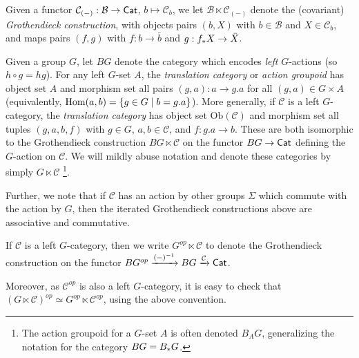 \documentclass[a4paper,10pt
,draft
]{article}%
\renewcommand{\1}{\eta}%
\begin{document}
\begin{notation}
      Given a functor $\mathcal C_{(-)}: \mathcal B \to \mathsf{Cat}$, $b \mapsto \mathcal C_b$, we let
      $\mathcal B \ltimes \mathcal C_{(-)}$ denote the (covariant) \textit{Grothendieck construction},
      with objects pairs $(b,X)$ with $b \in \mathcal B$ and $X \in \mathcal C_b$, and
      maps pairs $(f,g)$ with $f: b \to \bar b$ and $g: f_{\**}X \to \bar X$.
\end{notation}




\begin{example}
      \label{G_GR_REM}
      Given a group $G$, let $BG$ denote the category which encodes \textit{left} $G$-actions (so $h \circ g = h g$).
      For any left $G$-set $A$, the \textit{translation category} or \textit{action groupoid}
      has object set $A$
      and morphism set all pairs $(g,a): a \to g.a$ for all $(g,a) \in G \times A$
      (equivalently, $\operatorname{Hom}(a,b) = \left\{ g \in G \;|\; b = g.a\right\}$).
      More generally, if $\mathcal C$ is a left $G$-category, the \textit{translation category}
      has object set $\mathrm{Ob}(\mathcal C)$
      and morphism set all tuples $(g,a,b,f)$ with $g \in G$, $a,b\in \mathcal C$, and $f: g.a \to b$.
      These are both isomorphic to the Grothendieck construction $BG \ltimes \mathcal C$
      on the functor $BG \to \mathsf{Cat}$ defining the $G$-action on $\mathcal C$.
      We will mildly abuse notation and denote these categories by simply $G \ltimes \mathcal C$
      \footnote{
        The action groupoid for a $G$-set $A$ is often denoted $B_A G$, generalizing the notation for the category $B G = B_{\**} G$.}.
      
      Further, we note that if $\mathcal C$ has an action by other groups $\Sigma$ which commute with the action by $G$,
      then the iterated Grothendieck constructions above are associative and commutative.
\end{example}

\begin{remark}
      \label{GOP_REM}
      If $\mathcal C$ is a left $G$-category, then we write
      $G^{op} \ltimes \mathcal C$ to denote the Grothendieck construction on the functor
      $BG^{op} \xrightarrow{(-)^{-1}} BG \xrightarrow{\mathcal C} \mathsf{Cat}$.

      Moreover, as $\mathcal C^{op}$ is also a left $G$-category, it is easy to check that
      $(G \ltimes \mathcal C)^{op} \simeq G^{op} \ltimes \mathcal C^{op}$,
      using the above convention.
\end{remark}
\end{document}
